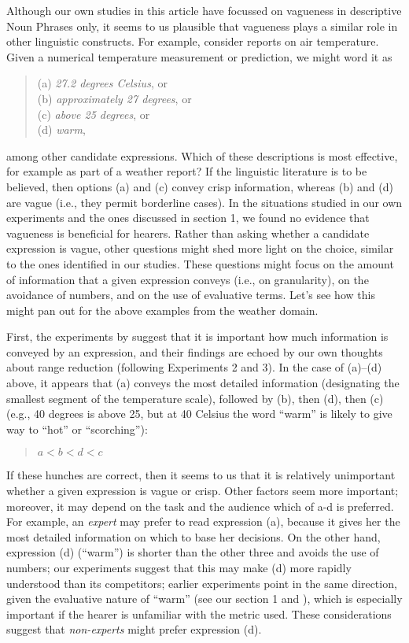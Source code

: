 Although our own studies in this article have focussed on vagueness in descriptive Noun Phrases only, it seems to us plausible that vagueness plays a similar role in other
linguistic constructs. For example, consider reports on air temperature. Given a numerical
temperature measurement or prediction, we might word it as 
%
\begin{quote}
(a) {\em 27.2 degrees Celsius}, or\\
(b) {\em approximately 27 degrees}, or\\
(c) {\em above 25 degrees}, or\\
(d) {\em warm}, 
\end{quote}
%
among other candidate expressions. Which of these descriptions is most effective, for example as part of a weather report? If the linguistic literature is to be believed, then options (a) and (c) convey crisp information, whereas (b) and (d) are vague (i.e., they permit borderline cases). In the situations studied in our own experiments and the ones discussed in section 1, we found no evidence that vagueness is beneficial for hearers. Rather than asking whether a candidate expression is vague, other questions might shed more light on the choice, similar to the ones identified in our studies. These questions might focus on the amount of information that a given expression conveys (i.e., on granularity), on the avoidance of numbers, and on the use of evaluative terms. Let's see how this might pan out for the above examples from the weather domain.

First, the experiments by \citeauthor{Mishra01042011} suggest that it is important how much information is conveyed by an expression, and their findings are echoed by our own thoughts about range reduction (following Experiments 2 and 3). In the case of (a)--(d) above, it appears that (a) conveys the most detailed information (designating the smallest segment of the temperature scale), followed by (b), then (d), then (c) (e.g., 40 degrees is above 25, but at 40 Celsius the word ``warm'' is likely to give way to ``hot'' or ``scorching''): 
%
\begin{quote}
$a < b < d < c$
\end{quote}
%
If these hunches are correct, then it seems to us that it is relatively unimportant whether a given expression is vague or crisp. Other factors seem more important; moreover, it may depend on the task and the audience which of a-d is preferred. For example, an \emph{expert} may prefer to read expression (a), because it gives her the most detailed information on which to base her decisions. On the other hand, expression (d) (``warm'') is shorter than the other three and avoids the use of numbers; our experiments suggest that this may make (d) more rapidly understood than its competitors; earlier experiments point in the same direction, given the evaluative nature of ``warm'' (see our section 1 and  \citeauthor{peters2009bringing}), which is especially important if the hearer is unfamiliar with the metric used. These considerations suggest that {\em non-experts} might prefer expression (d). 

